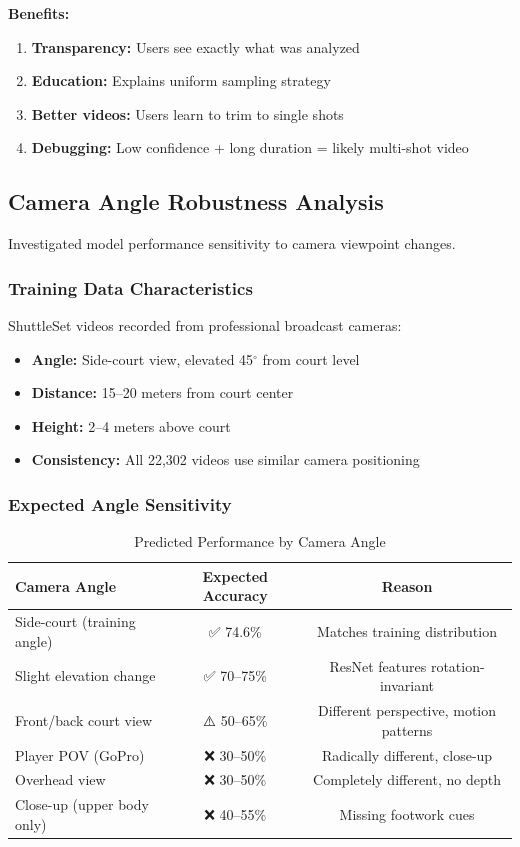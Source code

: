 \documentclass[12pt,a4paper]{article}
\begin{document}
\textbf{Benefits:}
\begin{enumerate}
\item \textbf{Transparency:} Users see exactly what was analyzed
\item \textbf{Education:} Explains uniform sampling strategy
\item \textbf{Better videos:} Users learn to trim to single shots
\item \textbf{Debugging:} Low confidence + long duration = likely multi-shot video
\end{enumerate}

\subsection{Camera Angle Robustness Analysis}

Investigated model performance sensitivity to camera viewpoint changes.

\subsubsection{Training Data Characteristics}

ShuttleSet videos recorded from professional broadcast cameras:
\begin{itemize}
\item \textbf{Angle:} Side-court view, elevated 45$^\circ$ from court level
\item \textbf{Distance:} 15--20 meters from court center
\item \textbf{Height:} 2--4 meters above court
\item \textbf{Consistency:} All 22,302 videos use similar camera positioning
\end{itemize}

\subsubsection{Expected Angle Sensitivity}

\begin{table}[H]
\centering
\caption{Predicted Performance by Camera Angle}
\begin{tabular}{lcc}
\toprule
Camera Angle & Expected Accuracy & Reason \\
\midrule
Side-court (training angle) & ✅ 74.6\% & Matches training distribution \\
Slight elevation change & ✅ 70--75\% & ResNet features rotation-invariant \\
Front/back court view & ⚠️ 50--65\% & Different perspective, motion patterns \\
Player POV (GoPro) & ❌ 30--50\% & Radically different, close-up \\
Overhead view & ❌ 30--50\% & Completely different, no depth \\
Close-up (upper body only) & ❌ 40--55\% & Missing footwork cues \\
\bottomrule
\end{tabular}
\end{table}
\end{document}
